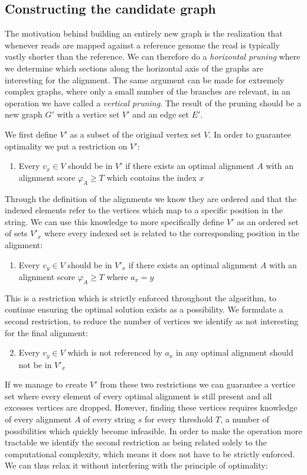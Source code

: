 \documentclass[thesis.tex]{subfiles}
\begin{document}
\subsection{Constructing the candidate graph}
The motivation behind building an entirely new graph is the realization that whenever reads are mapped against a reference genome the read is typically vastly shorter than the reference. We can therefore do a \textit{horizontal pruning} where we determine which sections along the horizontal axis of the graphs are interesting for the alignment. The same argument can be made for extremely complex graphs, where only a small number of the branches are relevant, in an operation we have called a \textit{vertical pruning}. The result of the pruning should be a new graph $G'$ with a vertice set $V'$ and an edge set $E'$.\\
\par\noindent
We first define $V'$ as a subset of the original vertex set $V$. In order to guarantee optimality we put a restriction on $V'$:
\begin{enumerate}
  \item Every $v_x \in V$ should be in $V'$ if there exists an optimal alignment $A$ with an alignment score $\varphi_A \geq T$ which contains the index $x$
\end{enumerate}
Through the definition of the alignments we know they are ordered and that the indexed elements refer to the vertices which map to a specific position in the string. We can use this knowledge to more specifically define $V'$ as an ordered set of sets $V'_x$ where every indexed set is related to the corresponding position in the alignment:
\begin{enumerate}
  \item Every $v_y \in V$ should be in $V'_x$ if there exists an optimal alignment $A$ with an alignment score  $\varphi_A \geq T$ where $a_x=y$
\end{enumerate}
This is a restriction which is strictly enforced throughout the algorithm, to continue ensuring the optimal solution exists as a possibility. We formulate a second restriction, to reduce the number of vertices we identify as not interesting for the final alignment:
\begin{enumerate}
  \setcounter{enumi}{1}
  \item Every $v_y \in V$ which is not referenced by $a_x$ in any optimal alignment should not be in $V'_x$
\end{enumerate}
If we manage to create $V'$ from these two restrictions we can guarantee a vertice set where every element of every optimal alignment is still present and all excesses vertices are dropped. However, finding these vertices requires knowledge of every alignment $A$ of every string $s$ for every threshold $T$, a number of possibilities which quickly become infeasible. In order to make the operation more tractable we identify the second restriction as being related solely to the computational complexity, which means it does not have to be strictly enforced. We can thus relax it without interfering with the principle of optimality:
\end{document}
